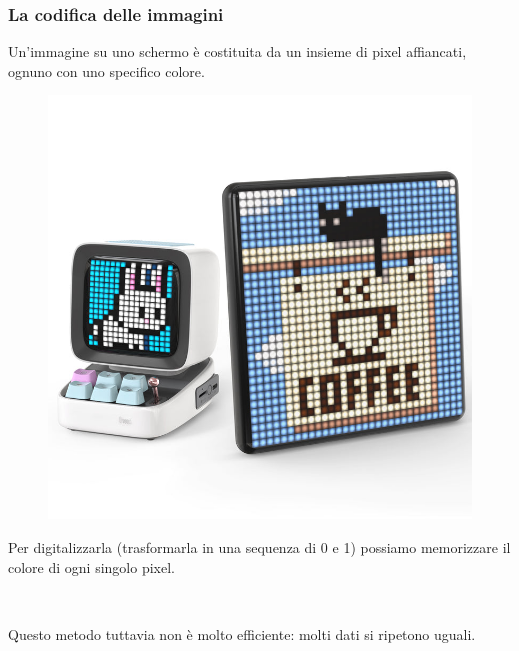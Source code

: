 \documentclass[handout]{beamer}
\begin{document}
\begin{frame}
\frametitle{La codifica delle immagini}
Un'immagine su uno schermo è costituita da un insieme di pixel affiancati, ognuno con uno specifico colore.
\begin{figure}
  \includegraphics[width=.3\columnwidth]{img/pixel.jpg}
\end{figure}\pause
Per digitalizzarla (trasformarla in una sequenza di 0 e 1) possiamo memorizzare il colore di ogni singolo pixel.\pause

~

Questo metodo tuttavia non è molto efficiente: molti dati si ripetono uguali.
\end{frame}
\end{document}
